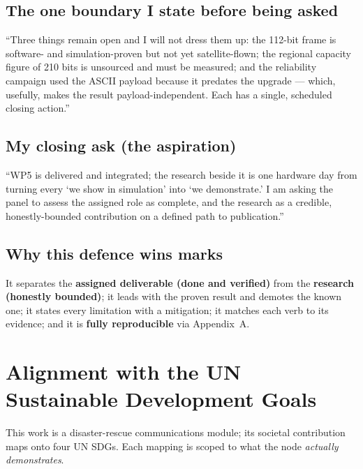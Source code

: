 \documentclass[11pt,a4paper]{article}
\begin{document}
\subsection{The one boundary I state before being asked}
\begin{callout}
``Three things remain open and I will not dress them up: the 112-bit frame is software- and
simulation-proven but not yet satellite-flown; the regional capacity figure of 210 bits is
unsourced and must be measured; and the reliability campaign used the ASCII payload because
it predates the upgrade --- which, usefully, makes the result payload-independent. Each has a
single, scheduled closing action.''
\end{callout}

\subsection{My closing ask (the aspiration)}
``WP5 is delivered and integrated; the research beside it is one hardware day from turning
every `we show in simulation' into `we demonstrate.' I am asking the panel to assess the
assigned role as complete, and the research as a credible, honestly-bounded contribution on
a defined path to publication.''

\subsection{Why this defence wins marks}
It separates the \textbf{assigned deliverable (done and verified)} from the \textbf{research
(honestly bounded)}; it leads with the proven result and demotes the known one; it states
every limitation with a mitigation; it matches each verb to its evidence; and it is
\textbf{fully reproducible} via Appendix~A.

\section{Alignment with the UN Sustainable Development Goals}

This work is a disaster-rescue communications module; its societal contribution maps onto
four UN SDGs. Each mapping is scoped to what the node \emph{actually demonstrates}.
\end{document}
